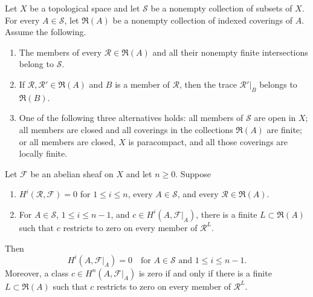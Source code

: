 \begin{lemma}
\label{lemma-covering-acyclicity-local-killing}
\begin{reference}
\cite[Chapter III, \S 3.9, Theorem 3.9.1, pp. 179--180]{Tohoku}
\end{reference}
Let $X$ be a topological space and let $\mathcal S$ be a nonempty
collection of subsets of $X$. For every $A\in\mathcal S$, let
$\mathfrak R(A)$ be a nonempty collection of indexed coverings of $A$.
Assume the following.
\begin{enumerate}
\item The members of every $\mathcal R\in\mathfrak R(A)$ and all their
nonempty finite intersections belong to $\mathcal S$.
\item If $\mathcal R,\mathcal R'\in\mathfrak R(A)$ and $B$ is a member of
$\mathcal R$, then the trace $\mathcal R'|_B$ belongs to
$\mathfrak R(B)$.
\item One of the following three alternatives holds: all members of
$\mathcal S$ are open in $X$; all members are closed and all coverings in
the collections $\mathfrak R(A)$ are finite; or all members are closed,
$X$ is paracompact, and all those coverings are locally finite.
\end{enumerate}
Let $\mathcal F$ be an abelian sheaf on $X$ and let $n\geq0$. Suppose
\begin{enumerate}
\item[$A(n)$] $H^i(\mathcal R,\mathcal F)=0$ for
$1\leq i\leq n$, every $A\in\mathcal S$, and every
$\mathcal R\in\mathfrak R(A)$.
\item[$B(n-1)$] For $A\in\mathcal S$, $1\leq i\leq n-1$, and
$c\in H^i(A,\mathcal F|_A)$, there is a finite
$L\subset\mathfrak R(A)$ such that $c$ restricts to zero on every member
of $\mathcal R^L$.
\end{enumerate}
Then
$$
H^i(A,\mathcal F|_A)=0
\quad\text{for }A\in\mathcal S\text{ and }1\leq i\leq n-1.
$$
Moreover, a class $c\in H^n(A,\mathcal F|_A)$ is zero if and only if
there is a finite $L\subset\mathfrak R(A)$ such that $c$ restricts to
zero on every member of $\mathcal R^L$.
\end{lemma}

